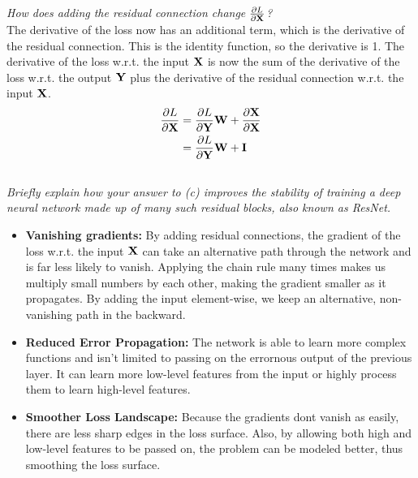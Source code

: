\documentclass[a4paper]{article}
\begin{document}
\subsection{} %
\textit{How does adding the residual connection change $\frac{\partial L}{\partial \mathbf{X}}$?}\\
The derivative of the loss now has an additional term, which is the derivative of the residual connection. This is the identity function,
so the derivative is 1. The derivative of the loss w.r.t. the input $\mathbf{X}$ is now the sum of the derivative of the loss w.r.t. the output $\mathbf{Y}$
plus the derivative of the residual connection w.r.t. the input $\mathbf{X}$.
\begin{align}
   \frac{\partial L}{\partial \mathbf{X}} &= \frac{\partial L}{\partial \mathbf{Y}}\mathbf{W} + \frac{\partial \mathbf{X}}{\partial \mathbf{X}} \\
   &= \frac{\partial L}{\partial \mathbf{Y}}\mathbf{W} + \mathbf{I}
\end{align}

\bigskip

\subsection{} %
\textit{Briefly explain how your answer to (c) improves the stability of training a deep neural network made up of many
such residual blocks, also known as ResNet.}
\begin{itemize}
   \item \textbf{Vanishing gradients:} By adding residual connections, the gradient of the loss w.r.t. the input $\mathbf{X}$
   can take an alternative path through the network and is far less likely to vanish. Applying the chain rule many times
   makes us multiply small numbers by each other, making the gradient smaller as it propagates. By adding the input
   element-wise, we keep an alternative, non-vanishing path in the backward.
   \item \textbf{Reduced Error Propagation:} The network is able to learn more complex functions and isn't limited to passing
   on the errornous output of the previous layer. It can learn more low-level features from the input or highly process them
   to learn high-level features.
   \item \textbf{Smoother Loss Landscape:} Because the gradients dont vanish as easily, there are less sharp edges in the loss
   surface. Also, by allowing both high and low-level features to be passed on, the problem can be modeled better, thus smoothing
   the loss surface.
\end{itemize}
\bigskip
\end{document}
